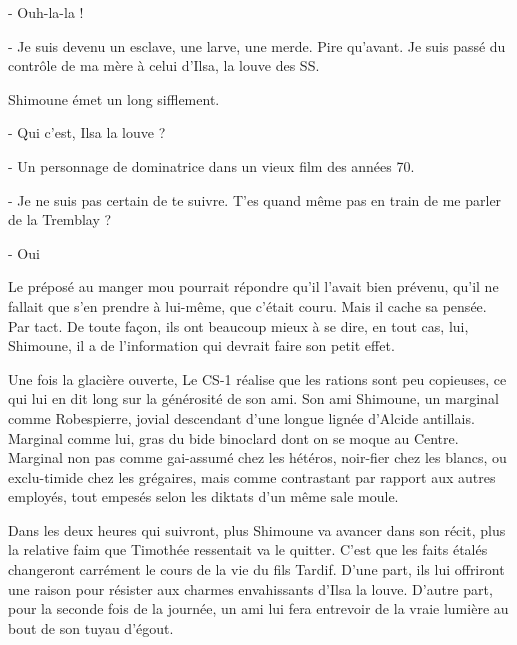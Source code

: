 - Ouh-la-la !

- Je suis devenu un esclave, une larve, une merde. Pire qu’avant. Je suis passé du contrôle de ma mère à celui d’Ilsa, la louve des SS.

Shimoune émet un long sifflement.

- Qui c’est, Ilsa la louve ?

- Un personnage de dominatrice dans un vieux film des années 70.

- Je ne suis pas certain de te suivre. T’es quand même pas en train de me parler de la Tremblay ?

- Oui

Le préposé au manger mou pourrait répondre qu’il l’avait bien prévenu, qu’il ne fallait que s’en prendre à lui-même, que c’était couru. Mais il cache sa pensée. Par tact. De toute façon, ils ont beaucoup mieux à se dire, en tout cas, lui, Shimoune, il a de l’information qui devrait faire son petit effet.

Une fois la glacière ouverte, Le CS-1 réalise que les rations sont peu copieuses, ce qui lui en dit long sur la générosité de son ami. Son ami Shimoune, un marginal comme Robespierre, jovial descendant d’une longue lignée d’Alcide antillais. Marginal comme lui, gras du bide binoclard dont on se moque au Centre. Marginal non pas comme gai-assumé chez les hétéros, noir-fier chez les blancs, ou exclu-timide chez les grégaires, mais comme contrastant par rapport aux autres employés, tout empesés selon les diktats d’un même sale moule.

Dans les deux heures qui suivront, plus Shimoune va avancer dans son récit, plus la relative faim que Timothée ressentait va le quitter. C’est que les faits étalés changeront carrément le cours de la vie du fils Tardif. D’une part, ils lui offriront une raison pour résister aux charmes envahissants d’Ilsa la louve. D’autre part, pour la seconde fois de la journée, un ami lui fera entrevoir de la vraie lumière au bout de son tuyau d’égout.